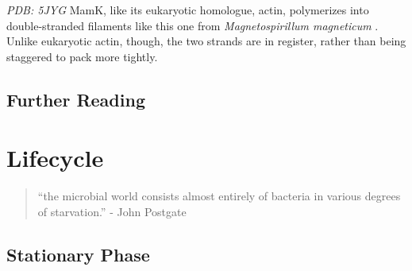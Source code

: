 \documentclass[]{tufte-book}
\begin{document}
\emph{PDB: 5JYG} MamK, like its eukaryotic homologue, actin, polymerizes
into double-stranded filaments like this one from \emph{Magnetospirillum
magneticum} \citep{bergeron2017}. Unlike eukaryotic actin, though, the
two strands are in register, rather than being staggered to pack more
tightly.

\section{Further Reading}\label{further-reading-6}

\citep{berg1988}

\citep{hazelbauer2008}

\citep{lower2013}

\citep{schuergers2016}

\chapter{Lifecycle}\label{lifecycle}

\begin{quote}
``the microbial world consists almost entirely of bacteria in various
degrees of starvation.'' - John Postgate \citep{postgate1994}
\end{quote}

\section{Stationary Phase}\label{stationary-phase}
\end{document}
